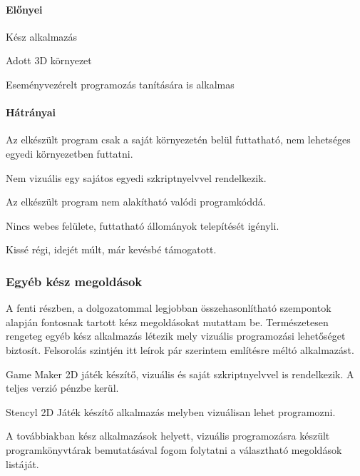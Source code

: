 \documentclass[12pt,a4paper,oneside]{report} %
\begin{document}
\paragraph{Előnyei} 
\begin{compactitem}
	\item Kész alkalmazás
	\item Adott 3D környezet
	\item Eseményvezérelt programozás tanítására is alkalmas
\end{compactitem}
\paragraph{Hátrányai} 
\begin{compactitem}
	\item Az elkészült program csak a saját környezetén belül futtatható, nem lehetséges egyedi környezetben futtatni.
	\item Nem vizuális egy sajátos egyedi szkriptnyelvvel rendelkezik.
	\item Az elkészült program nem alakítható valódi programkóddá.
	\item Nincs webes felülete, futtatható állományok telepítését igényli.
	\item Kissé régi, idejét múlt, már kevésbé támogatott.
\end{compactitem}

\subsubsection{Egyéb kész megoldások}
A fenti részben, a dolgozatommal legjobban összehasonlítható szempontok alapján fontosnak tartott kész megoldásokat mutattam be. Természetesen rengeteg egyéb kész alkalmazás létezik mely vizuális programozási lehetőséget biztosít. Felsorolás szintjén itt leírok pár szerintem említésre méltó alkalmazást. 
\begin{compactitem}
	\item Game Maker \cite{jenson2016exploring} 2D játék készítő, vizuális és saját szkriptnyelvvel is rendelkezik. A teljes verzió pénzbe kerül.
	\item Stencyl \cite{liu2014making} 2D Játék készítő alkalmazás melyben vizuálisan lehet programozni.
\end{compactitem}
A továbbiakban kész alkalmazások helyett, vizuális programozásra készült programkönyvtárak bemutatásával fogom folytatni a választható megoldások listáját.  
\end{document}
